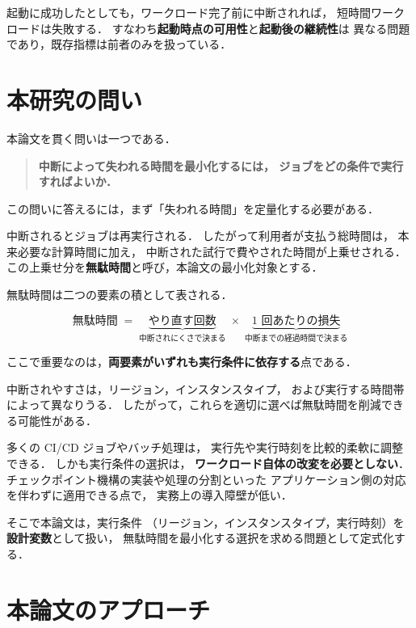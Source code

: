 \documentclass[11pt,a4paper]{ltjsreport}
\begin{document}
起動に成功したとしても，ワークロード完了前に中断されれば，
短時間ワークロードは失敗する．
すなわち\textbf{起動時点の可用性}と\textbf{起動後の継続性}は
異なる問題であり，既存指標は前者のみを扱っている．

\section{本研究の問い}
\label{sec:question}

本論文を貫く問いは一つである．

\begin{quote}
\textbf{中断によって失われる時間を最小化するには，
ジョブをどの条件で実行すればよいか．}
\end{quote}

この問いに答えるには，まず「失われる時間」を定量化する必要がある．

中断されるとジョブは再実行される．
したがって利用者が支払う総時間は，
本来必要な計算時間に加え，
中断された試行で費やされた時間が上乗せされる．
この上乗せ分を\textbf{無駄時間}と呼び，本論文の最小化対象とする．

無駄時間は二つの要素の積として表される．

\begin{equation}
\text{無駄時間} \;=\;
\underbrace{\text{やり直す回数}}_{\text{中断されにくさで決まる}}
\;\times\;
\underbrace{\text{1 回あたりの損失}}_{\text{中断までの経過時間で決まる}}
\label{eq:intro_waste}
\end{equation}

ここで重要なのは，\textbf{両要素がいずれも実行条件に依存する}点である．

中断されやすさは，リージョン，インスタンスタイプ，
および実行する時間帯によって異なりうる．
したがって，これらを適切に選べば無駄時間を削減できる可能性がある．

多くの CI/CD ジョブやバッチ処理は，
実行先や実行時刻を比較的柔軟に調整できる．
しかも実行条件の選択は，
\textbf{ワークロード自体の改変を必要としない}．
チェックポイント機構の実装や処理の分割といった
アプリケーション側の対応を伴わずに適用できる点で，
実務上の導入障壁が低い．

そこで本論文は，実行条件
（リージョン，インスタンスタイプ，実行時刻）を\textbf{設計変数}として扱い，
無駄時間を最小化する選択を求める問題として定式化する．

\section{本論文のアプローチ}
\end{document}

